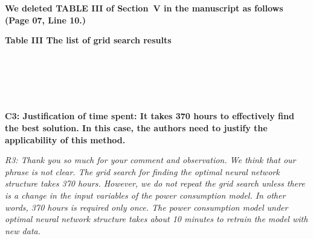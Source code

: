 \documentclass[onecolumn]{IEEEconf}
\begin{document}
\begin{description}
{	%
	}
	~\\
    ~\\
    \textbf{We deleted TABLE III of Section~V in the manuscript as follows (Page 07, Line 10.)}\\
    \begin{mdframed}[ linewidth=.75pt, userdefinedwidth=0.9\textwidth]
    \centering
    \textbf{Table III The list of grid search results}~\\
    ~\\
    ~\\
    \end{mdframed}
	~\\
	~\\
    \item \textbf
    {
	C3: Justification of time spent:
It takes 370 hours to effectively find the best solution. In this case, the authors need to justify the applicability of this method.
	}
	\item \textit
	{
	R3: Thank you so much for your comment and observation. We think that our phrase is not clear.
	The grid search for finding the optimal neural network structure takes 370 hours. However, we do not repeat the grid search unless there is a change in the input variables of the power consumption model.
	In other words, 370 hours is required only once.
    The power consumption model under optimal neural network structure takes about 10 minutes to retrain the model with new data.
}
\end{description}
\end{document}
